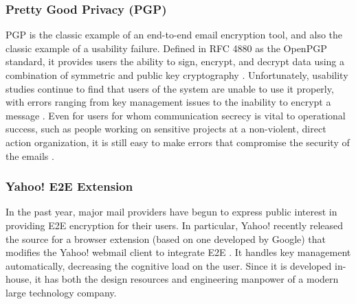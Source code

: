 \documentclass[pageno]{jpaper}
\begin{document}
\subsubsection{Pretty Good Privacy (PGP)}
PGP is the classic example of an end-to-end email encryption tool, and also the classic example of a usability failure. Defined in RFC 4880 as the OpenPGP standard, it provides users the ability to sign, encrypt, and decrypt data using a combination of symmetric and public key cryptography \cite{callas2007openpgp}. Unfortunately, usability studies continue to find that users of the system are unable to use it properly, with errors ranging from key management issues to the inability to encrypt a message \cite{whitten1999johnny} \cite{sheng2006johnny}. Even for users for whom communication secrecy is vital to operational success, such as people working on sensitive projects at a non-violent, direct action organization, it is still easy to make errors that compromise the security of the emails \cite{gaw2006secrecy}.

\subsubsection{Yahoo! E2E Extension}
In the past year, major mail providers have begun to express public interest in providing E2E encryption for their users. In particular, Yahoo! recently released the source for a browser extension (based on one developed by Google) that modifies the Yahoo! webmail client to integrate E2E \cite{yahooe2e}. It handles key management automatically, decreasing the cognitive load on the user. Since it is developed in-house, it has both the design resources and engineering manpower of a modern large technology company.
\end{document}
